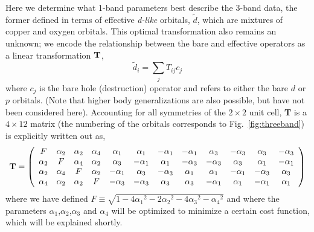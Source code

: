Here we determine what 1-band parameters best describe the 3-band data, the former defined 
in terms of effective \textit{d-like} orbitals, $\tilde{d}$, which are mixtures of copper and oxygen orbitals. 
This optimal transformation also remains an unknown; we encode the relationship between the 
bare and effective operators as a linear transformation ${\bf T}$, 
\begin{equation}
	\tilde{d}_i = \sum_{j} T_{ij} c_j
\end{equation}
where $c_j$ is the bare hole (destruction) operator and refers to either the bare $d$ or $p$ orbitals. 
(Note that higher body generalizations are also possible, but have not been considered here). 
Accounting for all symmetries of the $2\times2$ unit cell, {\bf T} is a $4 \times 12 $ matrix (the numbering of the orbitals 
corresponds to Fig.~\ref{fig:threeband}) is explicitly written out as, 
\begin{eqnarray}
{\bf T} = 
\left(
\begin{array}{cccccccccccc}
F        & \alpha_2 &        \alpha_2 &  \alpha_4 & \alpha_1 & \alpha_1 & -\alpha_1 & -\alpha_1 & \alpha_3 & -\alpha_3 & \alpha_3 & -\alpha_3 \\
\alpha_2 &  F       &        \alpha_4 &  \alpha_2 & \alpha_3 & -\alpha_1 & \alpha_1 & -\alpha_3 & -\alpha_3 & \alpha_3 & \alpha_1 & -\alpha_1 \\
\alpha_2 & \alpha_4 & F               &  \alpha_2 & -\alpha_1 & \alpha_3 & -\alpha_3 & \alpha_1 & \alpha_1 & -\alpha_1 & -\alpha_3 & \alpha_3 \\
\alpha_4 & \alpha_2 & \alpha_2        &   F       & -\alpha_3 & -\alpha_3 & \alpha_3 & \alpha_3 & -\alpha_1 & \alpha_1 & -\alpha_1 & \alpha_1 \\
\end{array}
\right)
\end{eqnarray}
where we have defined $F \equiv \sqrt{1-4{\alpha_1}^2 - 2{\alpha_2}^2 - 4 {\alpha_3}^2 -{\alpha_4}^2}$ and 
where the parameters $\alpha_1$,$\alpha_2$,$\alpha_3$ and $\alpha_4$ will be optimized to minimize a 
certain cost function, which will be explained shortly. 

